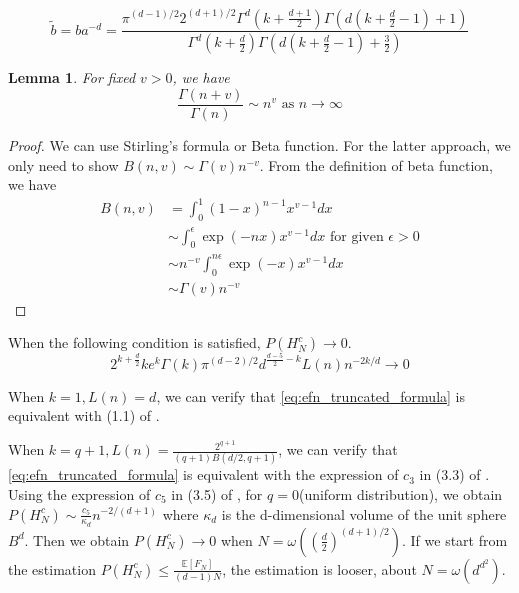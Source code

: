 \documentclass{article}
\newtheorem{lemma}{Lemma}
\def\E{\mathbb{E}}
\begin{document}
\begin{equation}
    \tilde{b} =ba^{-d}
    = \frac{\pi^{(d-1)/2} 2^{(d+1)/2}
    \Gamma^d(k+\frac{d+1}{2})
    \Gamma(d(k+\frac{d}{2}-1)+1)}{\Gamma^d(k+\frac{d}{2})\Gamma(d(k+\frac{d}{2}-1)+ \frac{3}{2})}
\end{equation}
\begin{lemma}
    For fixed $v>0$, we have
    \begin{equation}
        \frac{\Gamma(n+v)}{\Gamma(n)} \sim
        n^v
        \textrm{ as } n \to \infty             
    \end{equation}
\end{lemma}
\begin{proof}
    We can use Stirling's formula or Beta function.
    For the latter approach, we only need to show
    $B(n, v) \sim \Gamma(v) n^{-v}$.
    From the definition of beta function,
    we have
    \begin{align*}
        B(n,v) &=\int_0^1 (1-x)^{n-1} x^{v-1} dx \\
        &\sim \int_0^{\epsilon} \exp(-nx) x^{v-1}dx \textrm{ for given } \epsilon>0\\
        & \sim n^{-v} \int_0^{n\epsilon} \exp(-x)x^{v-1}dx\\
        &\sim \Gamma(v) n^{-v}
    \end{align*}
\end{proof}
When the following condition is satisfied, $P(H_N^c) \to 0$.
\begin{equation}
2^{k+\frac{d}{2}} k e^k \Gamma(k) \pi^{(d-2)/2} d^{\frac{d-5}{2} -k} L(n) n^{-2k/d}  \to 0   
\end{equation}

When $k=1, L(n)=d$, we can verify that
\eqref{eq:efn_truncated_formula} is equivalent with (1.1)
of \cite{raynaud1970enveloppe}.

When $k=q+1, L(n)=\frac{2^{q+1}}{(q+1)B(d/2,q+1)}$,
we can verify that
\eqref{eq:efn_truncated_formula} is equivalent with the expression of $c_3$
in (3.3) of \cite{affentranger1991convex}.
Using the expression of $c_5$ in (3.5) of 
\cite{affentranger1991convex},
for $q=0$(uniform distribution),
we obtain $P(H_N^c)\sim \frac{c_5}{\kappa_d}
n^{-2/(d+1)}$ where $\kappa_d$ is the d-dimensional volume of
the unit sphere $B^d$. Then we obtain $P(H_N^c) \to 0$
when $N=\omega((\frac{d}{2})^{(d+1)/2})$. If we start from the estimation
$P(H_N^c) \leq \frac{\E[F_N]}{(d-1)N}$, the estimation is looser, about
$N=\omega(d^{d^2})$.



\end{document}
